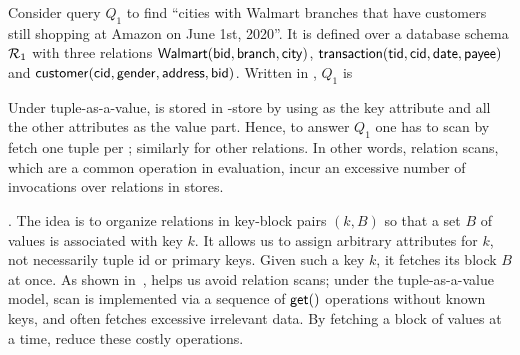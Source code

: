 \begin{example}\label{exa-taav}
Consider query $Q_{1}$ to find ``cities with Walmart branches that
have customers still shopping at %
Amazon on
June 1st, 2020''. It is
defined over
a database schema ${\mathcal R}_{1}$ with three relations
$\protect\mathsf{Walmart}(\protect\mathsf{bid},\allowbreak \protect\mathsf{branch},\allowbreak \protect\mathsf{city})$,
$\protect\mathsf{transaction}(\protect\mathsf{tid},\allowbreak \protect\mathsf{cid},\allowbreak \protect\mathsf{date},\allowbreak
\protect\mathsf{payee})$ and $\protect\mathsf{customer}(\protect\mathsf{cid},\allowbreak \protect\mathsf{gender},\allowbreak
\protect\mathsf{address},\allowbreak \protect\mathsf{bid})$. Written in \SQL, $Q_{1}$ is

\vspace{-0.1ex}
{\small
  }
\vspace{-0.3ex}

Under tuple-as-a-value,  is stored in \kv-store
by using  as the key attribute and all the other
attributes as the value part. Hence, to answer $Q_{1}$ one
has to scan  by fetch one tuple per \get;
similarly  for other relations. In other words, relation scans,
which are a common operation in \SQL evaluation, incur an excessive
number of \get invocations over relations in \kv stores.
\end{example}

\vspace{0.6ex}
. The idea is to organize
relations in key-block pairs $(k, B)$ so that a set $B$ of values
is associated with key $k$. It allows us to assign arbitrary
attributes for $k$, not necessarily tuple id or primary keys.
Given such a key $k$, it fetches its block $B$ at once.
As shown in~\cite{VLDB19}, \baav helps us avoid relation scans;
under the tuple-as-a-value model, scan is implemented via
a sequence %
of $\protect\mathsf{get}()$ operations without known keys,
and often fetches excessive irrelevant data. By fetching a block
of values at a time, \baav reduce these costly operations.



